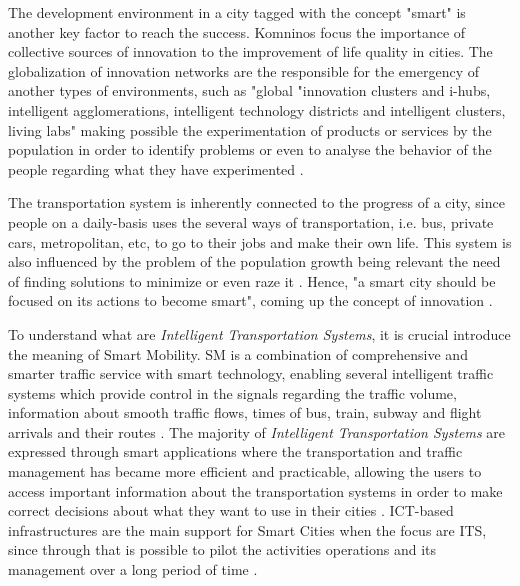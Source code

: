 The development environment in a city tagged with the concept "smart" is another key factor to reach the success. Komninos focus the importance of collective sources of innovation to the improvement of life quality in cities. The globalization of innovation networks are the responsible for the emergency of another types of environments, such as "global "innovation clusters and i-hubs, intelligent agglomerations, intelligent technology districts and intelligent clusters, living labs" making possible the experimentation of products or services by the population in order to identify problems or even to analyse the behavior of the people regarding what they have experimented \cite{kn:Komninos2009}.

The transportation system is inherently connected to the progress of a city, since people on a daily-basis uses the several ways of transportation, i.e. bus, private cars, metropolitan, etc, to go to their jobs and make their own life. This system is also influenced by the problem of the population growth being relevant the need of finding solutions to minimize or even raze it \cite{kn:Caragliu2015}. Hence, "a smart city should be focused on its actions to become smart", coming up the concept of innovation \cite{kn:Cecilia2016}.

To understand what are \textit{Intelligent Transportation Systems}, it is crucial introduce the meaning of Smart Mobility. SM is a combination of comprehensive and smarter traffic service with smart technology, enabling several intelligent traffic systems which provide control in the signals regarding the traffic volume, information about smooth traffic flows, times of bus, train, subway and flight arrivals and their routes \cite{kn:Chun2015}. The majority of \textit{Intelligent Transportation Systems} are expressed through smart applications where the transportation and traffic management has became more efficient and practicable, allowing the users to access important information about the transportation systems in order to make correct decisions about what they want to use in their cities \cite{kn:Caragliu2015}. ICT-based infrastructures are the main support for Smart Cities when the focus are ITS, since through that is possible to pilot the activities operations and its management over a long period of time \cite{kn:Cecilia2016}.

